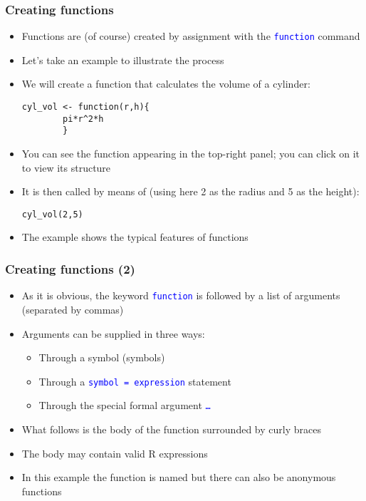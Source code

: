 \documentclass[10pt]{beamer}
\newcommand{\cc}[1]{\texttt{\textcolor{blue}{#1}}}
\theoremstyle{definition}
\begin{document}
\begin{frame}[fragile]
\frametitle{Creating functions}
\begin{itemize}
	\item Functions are (of course) created by assignment with the \cc{function} command
	\item Let's take an example to illustrate the process
	\item We will create a function that calculates the volume of a cylinder:
	\begin{lstlisting}[style = rstyle, breaklines]
	cyl_vol <- function(r,h){
		pi*r^2*h
		}
	\end{lstlisting}
	\item You can see the function appearing in the top-right panel; you can click on it to view its structure
	\item It is then called by means of (using here 2 as the radius and 5 as the height):
	\begin{lstlisting}[style = rstyle, breaklines]
	cyl_vol(2,5)
	\end{lstlisting}
	\item The example shows the typical features of functions
\end{itemize}
\end{frame}

\begin{frame}[fragile]
\frametitle{Creating functions (2)}
\begin{itemize}
	\item As it is obvious, the keyword \cc{function} is followed by a list of arguments (separated by commas)
	\item Arguments can be supplied in three ways:
	\begin{itemize}
		\item Through a symbol (symbols)
		\item Through a \cc{symbol = expression} statement
		\item Through the special formal argument \cc{\ldots}
	\end{itemize}
	\item What follows is the body of the function surrounded by curly braces
	\item The body may contain valid R expressions
	\item In this example the function is named but there can also be anonymous functions
\end{itemize}
\end{frame}
\end{document}
